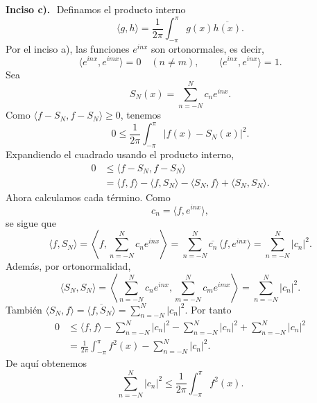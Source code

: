 \documentclass[11pt,letterpaper]{article}
\begin{document}
\textbf{Inciso c).}\,\
Definamos el producto interno
\begin{equation*}
    \langle g,h\rangle=\frac{1}{2\pi}\int_{-\pi}^{\pi}g(x)\overline{h(x)}.
\end{equation*}
Por el inciso a), las funciones $e^{inx}$ son ortonormales, es decir,
\begin{equation*}
    \langle e^{inx},e^{imx}\rangle=0\quad(n\neq m),
    \qquad
    \langle e^{inx},e^{inx}\rangle=1.
\end{equation*}
Sea
\begin{equation*}
    S_N(x)=\sum_{n=-N}^{N}c_n e^{inx}.
\end{equation*}
Como $\langle f-S_N,f-S_N\rangle\geq0$, tenemos
\begin{equation*}
    0\leq \frac{1}{2\pi}\int_{-\pi}^{\pi}|f(x)-S_N(x)|^2.
\end{equation*}
Expandiendo el cuadrado usando el producto interno,
\begin{align*}
    0
    &\leq \langle f-S_N,f-S_N\rangle \\
    &=\langle f,f\rangle-\langle f,S_N\rangle-\langle S_N,f\rangle+\langle S_N,S_N\rangle.
\end{align*}
Ahora calculamos cada término. Como
\begin{equation*}
    c_n=\langle f,e^{inx}\rangle,
\end{equation*}
se sigue que
\begin{equation*}
    \langle f,S_N\rangle
    =\left\langle f,\sum_{n=-N}^{N}c_ne^{inx}\right\rangle
    =\sum_{n=-N}^{N}\overline{c_n}\,\langle f,e^{inx}\rangle
    =\sum_{n=-N}^{N}|c_n|^2.
\end{equation*}
Además, por ortonormalidad,
\begin{equation*}
    \langle S_N,S_N\rangle
    =\left\langle \sum_{n=-N}^{N}c_ne^{inx},\sum_{m=-N}^{N}c_me^{imx}\right\rangle
    =\sum_{n=-N}^{N}|c_n|^2.
\end{equation*}
También $\langle S_N,f\rangle=\overline{\langle f,S_N\rangle}=\sum_{n=-N}^{N}|c_n|^2$. Por tanto
\begin{align*}
    0
    &\leq \langle f,f\rangle-\sum_{n=-N}^{N}|c_n|^2-\sum_{n=-N}^{N}|c_n|^2+\sum_{n=-N}^{N}|c_n|^2 \\
    &=\frac{1}{2\pi}\int_{-\pi}^{\pi}f^2(x)-\sum_{n=-N}^{N}|c_n|^2.
\end{align*}
De aquí obtenemos
\begin{equation*}
    \sum_{n=-N}^{N}|c_n|^2
    \leq \frac{1}{2\pi}\int_{-\pi}^{\pi}f^2(x).
\end{equation*}
\end{document}
